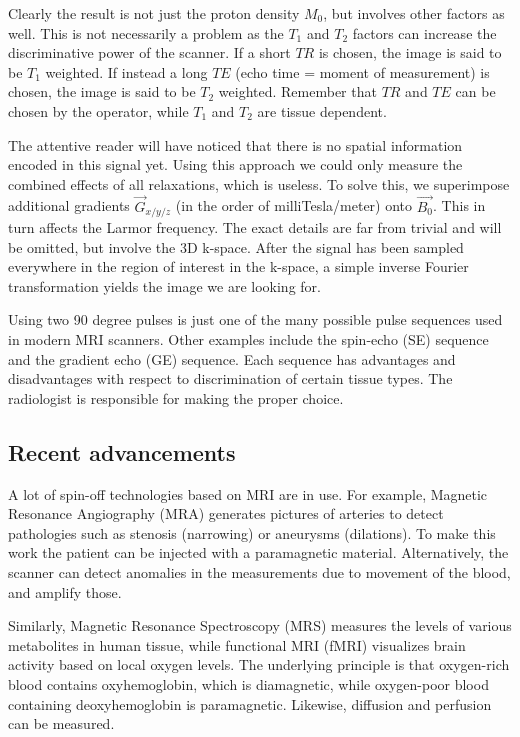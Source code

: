 Clearly the result is not just the proton density $M_0$, but involves
other factors as well. This is not necessarily a problem as the $T_1$ and
$T_2$ factors can increase the discriminative power of the scanner. If a short
$TR$ is chosen, the image is said to be $T_1$ weighted. If instead a long $TE$
(echo time = moment of measurement) is chosen, the image is said to be $T_2$
weighted. Remember that $TR$ and $TE$ can be chosen by the operator, while $T_1$
and $T_2$ are tissue dependent.

The attentive reader will have noticed that there is no spatial information
encoded in this signal yet. Using this approach we could only measure the
combined effects of all relaxations, which is useless. To solve this, we
superimpose additional gradients $\vec{G}_{x/y/z}$ (in the order of
milliTesla/meter) onto $\vec{B_0}$. This in turn affects the Larmor frequency.
The exact details are far from trivial and will be omitted, but involve the
3D k-space. After the signal has been sampled everywhere in the region of
interest in the k-space, a simple inverse Fourier transformation yields the
image we are looking for.

Using two 90 degree pulses is just one of the many possible pulse sequences used
in modern MRI scanners. Other examples include the spin-echo (SE) sequence and
the gradient echo (GE) sequence. Each sequence has advantages and disadvantages
with respect to discrimination of certain tissue types. The radiologist is
responsible for making the proper choice.


\subsection{Recent advancements}
A lot of spin-off technologies based on MRI are in use. For example, Magnetic
Resonance Angiography (MRA) generates pictures of arteries to detect pathologies
such as stenosis (narrowing) or aneurysms (dilations). To make this work the
patient can be injected with a paramagnetic material. Alternatively, the scanner
can detect anomalies in the measurements due to movement of the blood, and
amplify those.


Similarly, Magnetic Resonance Spectroscopy (MRS) measures the levels of various
metabolites in human tissue, while functional MRI (fMRI) visualizes brain
activity based on local oxygen levels. The underlying principle is that
oxygen-rich blood contains oxyhemoglobin, which is diamagnetic, while
oxygen-poor blood containing deoxyhemoglobin is paramagnetic. Likewise,
diffusion and perfusion can be measured.

